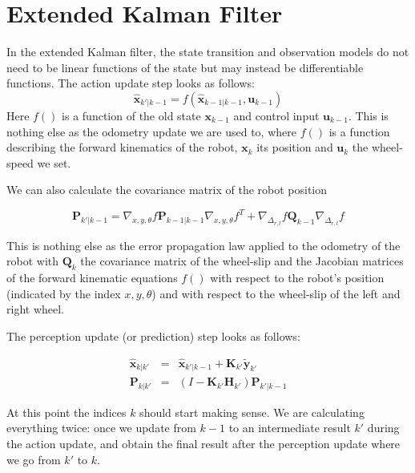 \section{Extended Kalman Filter}\label{sec:EKF}
In the extended Kalman filter, the state transition and observation models do not need to be linear functions of the state but may instead be differentiable functions. The action update step looks as follows:
\begin{equation}
\hat{\boldsymbol{x}}_{k'|k-1} = f(\hat{\boldsymbol{x}}_{k-1|k-1}, \boldsymbol{u}_{k-1})
\end{equation}
Here $ f()$ is a function of the old state $ \boldsymbol{x}_{k-1}$ and control input $ \boldsymbol{u}_{k-1}$. This is nothing else as the odometry update we are used to, where $ f()$ is a function describing the forward kinematics of the robot, $ \boldsymbol{x}_k$ its position and $ \boldsymbol{u}_k$ the wheel-speed we set.

We can also calculate the covariance matrix of the robot position

\begin{equation}
\boldsymbol{P}_{k'|k-1} = \nabla_{x,y,\theta}f \boldsymbol{P}_{k-1|k-1}\nabla_{x,y,\theta}f^T + \nabla_{\Delta_{r,l}}f\boldsymbol{Q}_{k-1}\nabla_{\Delta_{r,l}}f
\end{equation}

This is nothing else as the error propagation law applied to the odometry of the robot with $ \boldsymbol{Q}_k$ the covariance matrix of the wheel-slip and the Jacobian matrices of the forward kinematic equations $ f()$ with respect to the robot's position (indicated by the index $ x,y,\theta$) and with respect to the wheel-slip of the left and right wheel.

The perception update (or prediction) step looks as follows:

\begin{eqnarray}
\hat{\boldsymbol{x}}_{k|k'} &=& \hat{\boldsymbol{x}}_{k'|k-1} + \boldsymbol{K}_{k'}\tilde{\boldsymbol{y}}_{k'}\\
\boldsymbol{P}_{k|k'} &=& (I - \boldsymbol{K}_{k'} {\boldsymbol{H}_{k'}}) \boldsymbol{P}_{k'|k-1}
\end{eqnarray}

At this point the indices $ k$ should start making sense. We are calculating everything twice: once we update from $ k-1$ to an intermediate result $ k'$ during the action update, and obtain the final result after the perception update where we go from $ k'$ to $ k$.

